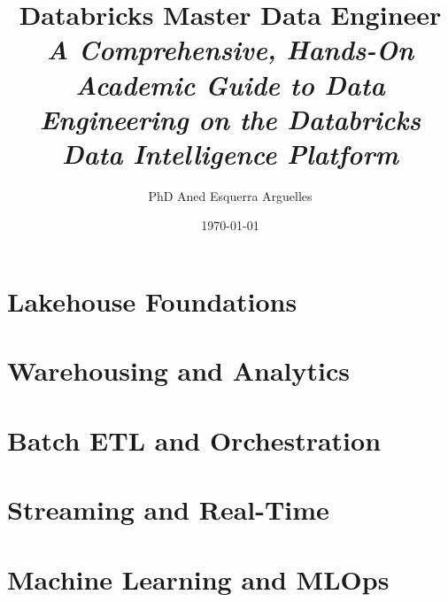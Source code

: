 \documentclass[11pt,a4paper,oneside]{book}
\title{\Huge \textbf{Databricks Master Data Engineer}\\[1em]
\Large \textit{A Comprehensive, Hands-On Academic Guide to Data Engineering on the Databricks Data Intelligence Platform}}
\author{PhD Aned Esquerra Arguelles}
\date{\today}
\begin{document}
\frontmatter



\tableofcontents
\listoffigures
\listoftables

\mainmatter

\setcounter{chapter}{-1}


\part{Lakehouse Foundations}





\part{Warehousing and Analytics}





\part{Batch ETL and Orchestration}





\part{Streaming and Real-Time}





\part{Machine Learning and MLOps}




\end{document}
